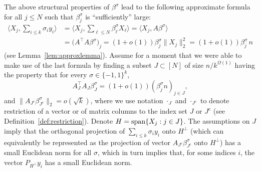 \documentclass[11pt]{amsart}
\theoremstyle{definition}
\theoremstyle{plain}
\begin{document}
The above structural properties of $\beta^\sigma$
lead to the following approximate formula for all $j\leq N$ such that 
$\beta^\sigma_j$ is ``sufficiently'' large:
\begin{equation*}    
\begin{split}
\langle X_j, \sum_{i\leq k} \sigma_i y_i\rangle &= \langle X_j, \sum_{\ell\leq N}\beta^\sigma_\ell X_\ell\rangle 
= \langle X_j, A\beta^\sigma\rangle \\
&=
\big(A^\top A \beta^\sigma\big)_j
= (1+o(1)) \beta_j^\sigma \|X_j\|_2^2
= (1+o(1)) \beta_j^\sigma\,n
\end{split}
\end{equation*}
(see Lemma~\ref{lem:approxlemma}).
Assume for a moment that we were able to make use of the last formula
by finding a subset $J\subset[N]$
of size $n/k^{\Omega(1)}$ having the property that for every $\sigma\in\{-1,1\}^k$,
$$A_{J}^\top A_{J}\beta^\sigma_{J} =(1+o(1)) (\beta_j^\sigma n)_{j\in J},$$
and $\|A_{J^c}\beta^\sigma_{J^c}\|_2=o(\sqrt{k})$,
where we use notation $\cdot_J$ and $\cdot_{J^c}$
to denote restriction of a vector or of matrix columns to the index set $J$ or $J^c$
(see Definition~\ref{def:restriction}).
Denote $H={\rm span}\{X_j : j \in J\}$.
The assumptions on $J$ imply that the orthogonal
projection of $\sum_{i\leq k} \sigma_i y_i$ onto $H^\perp$
(which can equivalently be represented as the projection 
of vector $A_{J^c}\beta^\sigma_{J^c}$ onto $H^\perp$)
has a small Euclidean norm for all $\sigma$, which in turn implies that, for some
indices $i$, the vector $P_{H^\perp}y_i$ has a small Euclidean norm.
\end{document}
